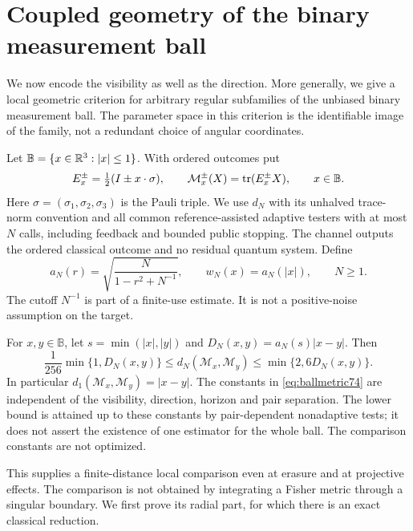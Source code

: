 \section{Coupled geometry of the binary measurement ball}\label{sec:coupled74}
We now encode the visibility as well as the direction. More generally,
we give a local geometric criterion for arbitrary regular subfamilies
of the unbiased binary measurement ball. The parameter space in this
criterion is the identifiable image of the family, not a redundant
choice of angular coordinates.

Let $\mathbb B=\{x\in\mathbb R^3:|x|\le1\}$. With ordered outcomes put
\begin{equation}\label{eq:ballfamily74}
 E_x^\pm=\tfrac12(I\pm x\cdot\sigma),\qquad
 \mathcal M_x^\pm(X)=\operatorname{tr}(E_x^\pm X),\qquad x\in\mathbb B.
\end{equation}
Here $\sigma=(\sigma_1,\sigma_2,\sigma_3)$ is the Pauli triple. We use
$d_N$ with its unhalved trace-norm convention and all common
reference-assisted adaptive testers with at most $N$ calls, including
feedback and bounded public stopping. The channel outputs the ordered
classical outcome and no residual quantum system. Define
\begin{equation}\label{eq:weight74}
 a_N(r)=\sqrt{\frac{N}{1-r^2+N^{-1}}},\qquad
 w_N(x)=a_N(|x|),\qquad N\ge1.
\end{equation}
The cutoff $N^{-1}$ is part of a finite-use estimate. It is not a
positive-noise assumption on the target.

\begin{theorem}\label{thm:ballmetric74}
For $x,y\in\mathbb B$, let $s=\min(|x|,|y|)$ and
$D_N(x,y)=a_N(s)|x-y|$. Then
\begin{equation}\label{eq:ballmetric74}
 \frac1{256}\min\{1,D_N(x,y)\}
 \le d_N(\mathcal M_x,\mathcal M_y)
 \le\min\{2,6D_N(x,y)\}.
\end{equation}
In particular $d_1(\mathcal M_x,\mathcal M_y)=|x-y|$. The constants
in \eqref{eq:ballmetric74} are independent of the visibility, direction,
horizon and pair separation. The lower bound is attained up to these
constants by pair-dependent nonadaptive tests; it does not assert the
existence of one estimator for the whole ball. The comparison constants
are not optimized.
\end{theorem}
This supplies a finite-distance local comparison even at erasure and
at projective effects. The comparison is not obtained by integrating a
Fisher metric through a singular boundary. We first prove its radial
part, for which there is an exact classical reduction.

